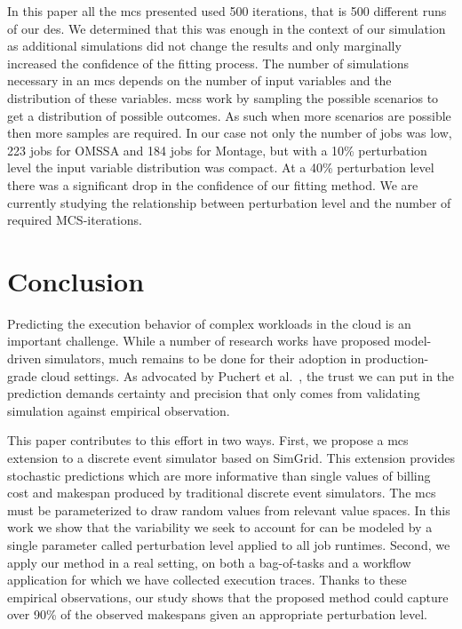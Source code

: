\documentclass[10pt,conference,compsocconf]{IEEEtran}
\begin{document}
In this paper all the \ac{mcs} presented used 500 iterations, that is 500
different runs of our \ac{des}. We determined that this was enough in the
context of our simulation as additional simulations did not change the results
and only marginally increased the confidence of the fitting process. The number
of simulations necessary in an \ac{mcs} depends on the number of input variables
and the distribution of these variables. \aclp{mcs} work by sampling the possible
scenarios to get a distribution of possible outcomes. As such when more scenarios are
possible then more samples are required. In our case not only the number of jobs
was low, 223 jobs for OMSSA and 184 jobs for Montage, but with a 10\%
perturbation level the input variable distribution was compact. At a 40\%
perturbation level there was a significant drop in the confidence of our fitting
method. We are currently studying the relationship between perturbation level
and the number of required MCS-iterations.

\section{Conclusion}
Predicting  the execution  behavior  of complex  workloads in  the  cloud is  an
important challenge. While a number of research works have proposed model-driven
simulators, much remains to be done for their adoption in production-grade cloud
settings. As  advocated by Puchert  et al.~\cite{PucherGWK15}, the trust  we can
put in  the prediction  demands certainty  and precision  that only  comes from
validating simulation against empirical observation.

This paper contributes to this effort in two ways. First, we propose a \acl{mcs}
extension  to a  discrete  event  simulator based  on  SimGrid.  This  extension
provides stochastic predictions which are more informative than single values of
billing cost  and makespan  produced by  traditional discrete  event simulators.
The \acl{mcs}  must be parameterized to  draw random values from  relevant value
spaces. In this work we show that the  variability we seek to account for can be
modeled  by a  single parameter  called perturbation  level applied  to all  job
runtimes. Second, we apply our method in  a real setting, on both a bag-of-tasks
and a workflow application for which we have collected execution traces.  Thanks
to these empirical observations, our study  shows that the proposed method could
capture over  90\% of the  observed makespans given an  appropriate perturbation
level.
\end{document}
